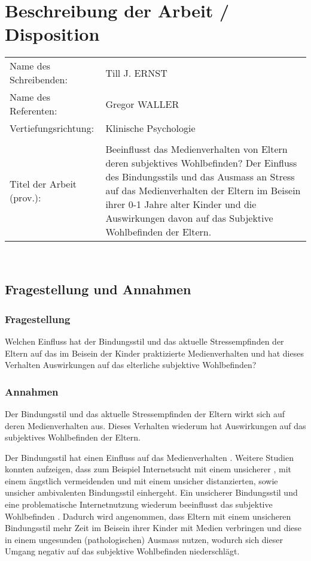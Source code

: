 \section{Beschreibung der Arbeit / Disposition}
\hspace{-0.9cm} %
\begin{tabular}{p{} p{10cm}} 
Name des Schreibenden: & Till J. ERNST \\ 
Name des Referenten: & Gregor WALLER \\
Vertiefungsrichtung: & Klinische Psychologie \\
& \\
Titel der Arbeit (prov.): & Beeinflusst das Medienverhalten von Eltern deren subjektives Wohlbefinden? Der Einfluss des Bindungsstils und das Ausmass an Stress auf das Medienverhalten der Eltern im Beisein ihrer 0-1 Jahre alter Kinder und die Auswirkungen davon auf das Subjektive Wohlbefinden der Eltern. \\
\end{tabular} \\
\subsection{Fragestellung und Annahmen}
\subsubsection{Fragestellung}
Welchen Einfluss hat der Bindungsstil und das aktuelle Stressempfinden der Eltern auf das im Beisein der Kinder praktizierte Medienverhalten und hat dieses Verhalten Auswirkungen auf das elterliche subjektive Wohlbefinden?
\subsubsection{Annahmen}
Der Bindungsstil und das aktuelle Stressempfinden der Eltern wirkt sich auf deren Medienverhalten aus. Dieses Verhalten wiederum hat Auswirkungen auf das subjektives Wohlbefinden der Eltern.

Der Bindungsstil hat einen Einfluss auf das Medienverhalten \cite{Lin2015, Monacis2017}. Weitere Studien konnten aufzeigen, dass zum Beispiel Internetsucht mit einem unsicherer \cite{Lin2011, Severino2013}, mit einem ängstlich vermeidenden \cite{Shin2011} und mit einem unsicher distanzierten, sowie unsicher ambivalenten Bindungsstil \cite{Odaci2014} einhergeht. Ein unsicherer Bindungsstil und eine problematische Internetnutzung wiederum beeinflusst das subjektive Wohlbefinden \cite{Odaci2014}.	 
Dadurch wird angenommen, dass Eltern mit einem unsicheren Bindungsstil mehr Zeit im Beisein ihrer Kinder mit Medien verbringen und diese in einem ungesunden (pathologischen) Ausmass nutzen, wodurch sich dieser Umgang negativ auf das subjektive Wohlbefinden niederschlägt.  

